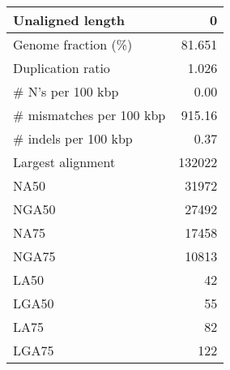 \documentclass[12pt,a4paper]{article}
\begin{document}
\begin{table}[ht]
\begin{center}
\begin{tabular}{|l*{1}{|r}|}
Unaligned length & 0 \\ \hline
Genome fraction (\%) & 81.651 \\ \hline
Duplication ratio & 1.026 \\ \hline
\# N's per 100 kbp & 0.00 \\ \hline
\# mismatches per 100 kbp & 915.16 \\ \hline
\# indels per 100 kbp & 0.37 \\ \hline
Largest alignment & 132022 \\ \hline
NA50 & 31972 \\ \hline
NGA50 & 27492 \\ \hline
NA75 & 17458 \\ \hline
NGA75 & 10813 \\ \hline
LA50 & 42 \\ \hline
LGA50 & 55 \\ \hline
LA75 & 82 \\ \hline
LGA75 & 122 \\ \hline
\end{tabular}
\end{center}
\end{table}
\end{document}
